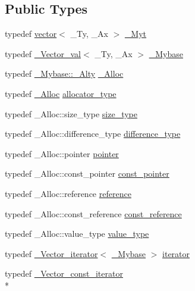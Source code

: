 \subsection*{Public Types}
\begin{DoxyCompactItemize}
\item 
typedef \hyperlink{classvector}{vector}$<$ \+\_\+\+Ty, \+\_\+\+Ax $>$ \hyperlink{classvector_ae499c665535254a7364e3a219b780112}{\+\_\+\+Myt}
\item 
typedef \hyperlink{class___vector__val}{\+\_\+\+Vector\+\_\+val}$<$ \+\_\+\+Ty, \+\_\+\+Ax $>$ \hyperlink{classvector_a1d0fa35df9c0b874ea870eae971fe5e0}{\+\_\+\+Mybase}
\item 
typedef \hyperlink{class___vector__val_ad273d1146bf265f65e75133aa2f9986a}{\+\_\+\+Mybase\+::\+\_\+\+Alty} \hyperlink{classvector_af95a9863612fdd67572c39c825c5aee6}{\+\_\+\+Alloc}
\item 
typedef \hyperlink{classvector_af95a9863612fdd67572c39c825c5aee6}{\+\_\+\+Alloc} \hyperlink{classvector_ae35ea7650735172fd02fdd94aa530a25}{allocator\+\_\+type}
\item 
typedef \+\_\+\+Alloc\+::size\+\_\+type \hyperlink{classvector_ac975e84f5d6c2fe2267bb354a85818af}{size\+\_\+type}
\item 
typedef \+\_\+\+Alloc\+::difference\+\_\+type \hyperlink{classvector_a5972097c9d52210f29e2d753a75b0a7a}{difference\+\_\+type}
\item 
typedef \+\_\+\+Alloc\+::pointer \hyperlink{classvector_a7f69707c8f1cc638260b523d48793523}{pointer}
\item 
typedef \+\_\+\+Alloc\+::const\+\_\+pointer \hyperlink{classvector_a52b51d85dd355481f31b8d1643d5b969}{const\+\_\+pointer}
\item 
typedef \+\_\+\+Alloc\+::reference \hyperlink{classvector_a68d6b0f887c9e4d0f422a1e3900b9794}{reference}
\item 
typedef \+\_\+\+Alloc\+::const\+\_\+reference \hyperlink{classvector_a22ae7381c38ba94955ba45177b24a51f}{const\+\_\+reference}
\item 
typedef \+\_\+\+Alloc\+::value\+\_\+type \hyperlink{classvector_acb600d25126cc0f3871b5a73f840acad}{value\+\_\+type}
\item 
typedef \hyperlink{class___vector__iterator}{\+\_\+\+Vector\+\_\+iterator}$<$ \hyperlink{classvector_a1d0fa35df9c0b874ea870eae971fe5e0}{\+\_\+\+Mybase} $>$ \hyperlink{classvector_a5a7a542bca0f55f43e161bd5a09c483d}{iterator}
\item 
typedef \hyperlink{class___vector__const__iterator}{\+\_\+\+Vector\+\_\+const\+\_\+iterator}\\*

\end{DoxyCompactItemize}
